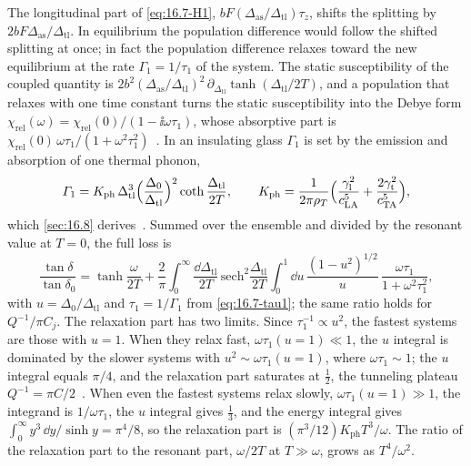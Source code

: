 The longitudinal part of \cref{eq:16.7-H1}, $bF(\Delta_{\mathrm{as}}/\Delta_{\mathrm{tl}})\tau_z$, shifts the splitting by $2bF\Delta_{\mathrm{as}}/\Delta_{\mathrm{tl}}$. In equilibrium the population difference would follow the shifted splitting at once; in fact the population difference relaxes toward the new equilibrium at the rate $\varGamma_1 = 1/\tau_1$ of the system. The static susceptibility of the coupled quantity is $2b^2(\Delta_{\mathrm{as}}/\Delta_{\mathrm{tl}})^2\,\partial_{\Delta_{\mathrm{tl}}}\tanh(\Delta_{\mathrm{tl}}/2T)$, and a population that relaxes with one time constant turns the static susceptibility into the Debye form $\chi_{\mathrm{rel}}(\omega) = \chi_{\mathrm{rel}}(0)/(1 - \ii\omega\tau_1)$, whose absorptive part is $\chi_{\mathrm{rel}}(0)\,\omega\tau_1/(1 + \omega^2\tau_1^2)$~\cite[Eq.~(6)]{meissner2021acoustic}. In an insulating glass $\varGamma_1$ is set by the emission and absorption of one thermal phonon,
\begin{equation}
  \varGamma_1 = K_{\mathrm{ph}}\,\Delta_{\mathrm{tl}}^3\Bigl(\frac{\Delta_0}{\Delta_{\mathrm{tl}}}\Bigr)^2\coth\frac{\Delta_{\mathrm{tl}}}{2T} , \qquad
  K_{\mathrm{ph}} = \frac{1}{2\pi\rho_T}\Bigl(\frac{\gamma_{\mathrm{l}}^2}{c_{\mathrm{LA}}^5} + \frac{2\gamma_{\mathrm{t}}^2}{c_{\mathrm{TA}}^5}\Bigr) ,
  \label{eq:16.7-tau1}
\end{equation}
which \cref{sec:16.8} derives~\cite[Eq.~(7)]{meissner2021acoustic}. Summed over the ensemble and divided by the resonant value at $T = 0$, the full loss is
\begin{equation}
  \frac{\tan\delta}{\tan\delta_0} = \tanh\frac{\omega}{2T} + \frac{2}{\pi}\int_0^\infty\frac{\dd\Delta_{\mathrm{tl}}}{2T}\,\mathrm{sech}^2\frac{\Delta_{\mathrm{tl}}}{2T}\int_0^1\dd u\,\frac{(1 - u^2)^{1/2}}{u}\,\frac{\omega\tau_1}{1 + \omega^2\tau_1^2} ,
  \label{eq:16.7-relax}
\end{equation}
with $u = \Delta_0/\Delta_{\mathrm{tl}}$ and $\tau_1 = 1/\varGamma_1$ from \cref{eq:16.7-tau1}; the same ratio holds for $Q^{-1}/\pi C_j$. The relaxation part has two limits. Since $\tau_1^{-1} \propto u^2$, the fastest systems are those with $u = 1$. When they relax fast, $\omega\tau_1(u = 1) \ll 1$, the $u$ integral is dominated by the slower systems with $u^2 \sim \omega\tau_1(u = 1)$, where $\omega\tau_1 \sim 1$; the $u$ integral equals $\pi/4$, and the relaxation part saturates at $\tfrac12$, the tunneling plateau $Q^{-1} = \pi C/2$~\cite[Eq.~(10)]{buchenau2020sound}. When even the fastest systems relax slowly, $\omega\tau_1(u = 1) \gg 1$, the integrand is $1/\omega\tau_1$, the $u$ integral gives $\tfrac13$, and the energy integral gives $\int_0^\infty y^3\,\dd y/\sinh y = \pi^4/8$, so the relaxation part is $(\pi^3/12)K_{\mathrm{ph}}T^3/\omega$. The ratio of the relaxation part to the resonant part, $\omega/2T$ at $T \gg \omega$, grows as $T^4/\omega^2$.

